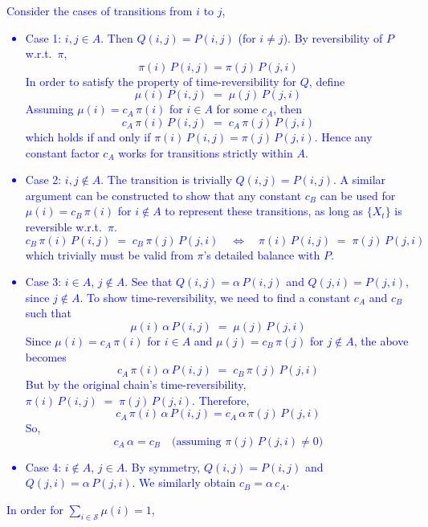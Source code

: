 \documentclass{article}
\begin{document}
\begin{itemize}
    \textcolor{blue}{
Consider the cases of transitions from $i$ to $j$,
\begin{itemize}
\item Case 1: $i,j \in A$. Then $Q(i,j) = P(i,j)$ (for $i\neq j$). By reversibility of $P$ w.r.t.\ $\pi$,
\[
  \pi(i)\,P(i,j) = \pi(j)\,P(j,i)
\]
In order to satisfy the property of time-reversibility for $Q$, define
\[
  \mu(i)\,P(i,j)\;=\;\mu(j)\,P(j,i)
\]
Assuming $\mu(i)=c_A\,\pi(i)$ for $i\in A$ for some $c_A$, then
\[
  c_A\,\pi(i)\,P(i,j) 
  \;=\;
  c_A\,\pi(j)\,P(j,i)
\]
which holds if and only if $\pi(i)\,P(i,j)=\pi(j)\,P(j,i)$. 
Hence any constant factor $c_A$ works for transitions strictly within $A$.
\item Case 2: $i,j \notin A$. The transition is trivially $Q(i,j)=P(i,j)$.
A similar argument can be constructed to show that any constant $c_B$ can be used for $\mu(i) = c_B\,\pi(i)$ for $i\notin A$ to represent these transitions, as long as $\{X_t\}$ is reversible w.r.t.\ $\pi$. 
\[
  c_B\,\pi(i)\,P(i,j)\;=\;c_B\,\pi(j)\,P(j,i)
  \quad\Longleftrightarrow\quad
  \pi(i)\,P(i,j)\;=\;\pi(j)\,P(j,i)
\]
which trivially must be valid from $\pi$'s detailed balance with $P$.
\item Case 3: $i\in A$, $j\notin A$. See that $Q(i,j)=\alpha\,P(i,j)$ and $Q(j,i)=P(j,i)$, since $j\notin A$. 
To show time-reversibility, we need to find a constant $c_A$ and $c_B$ such that 
\[
  \mu(i)\,\alpha\,P(i,j)\;=\;\mu(j)\,P(j,i)
\]
Since $\mu(i)=c_A\,\pi(i)$ for $i\in A$ and $\mu(j)=c_B\,\pi(j)$ for $j\notin A$, the above becomes
\[
  c_A\,\pi(i)\,\alpha\,P(i,j) 
  \;=\;
  c_B\,\pi(j)\,P(j,i)
\]
But by the original chain's time-reversibility, 
\(
  \pi(i)\,P(i,j) \;=\; \pi(j)\,P(j,i).
\)
Therefore, 
$$ c_A\,\pi(i)\,\alpha\,P(i,j) = c_A\,\alpha\,\pi(j)\,P(j,i)$$
So, 
\[
  c_A\,\alpha = c_B
  \quad
  \bigl(\text{assuming } \pi(j)\,P(j,i)\neq 0\bigr)
\]
\item Case 4: $i\notin A$, $j\in A$. By symmetry, $Q(i,j)=P(i,j)$ and $Q(j,i)=\alpha\,P(j,i)$. 
We similarly obtain $c_B = \alpha\,c_A$. 
\end{itemize}
In order for $\sum_{i\in \mathcal{S}} \mu(i)=1$,
}
\end{itemize}
\end{document}
